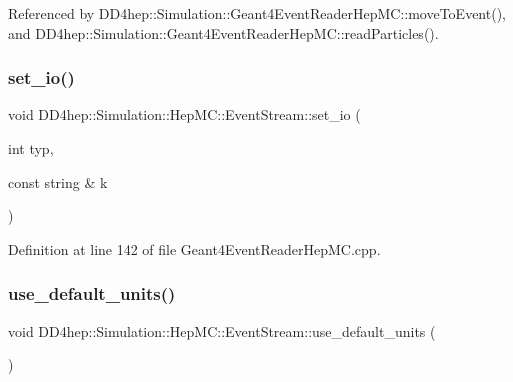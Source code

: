 Referenced by D\+D4hep\+::\+Simulation\+::\+Geant4\+Event\+Reader\+Hep\+M\+C\+::move\+To\+Event(), and D\+D4hep\+::\+Simulation\+::\+Geant4\+Event\+Reader\+Hep\+M\+C\+::read\+Particles().

\hypertarget{class_d_d4hep_1_1_simulation_1_1_hep_m_c_1_1_event_stream_a8c27011e1d7e6ae4b72e763d9253824d}{}\label{class_d_d4hep_1_1_simulation_1_1_hep_m_c_1_1_event_stream_a8c27011e1d7e6ae4b72e763d9253824d} 
\subsubsection{\texorpdfstring{set\+\_\+io()}{set\_io()}}
{\footnotesize\ttfamily void D\+D4hep\+::\+Simulation\+::\+Hep\+M\+C\+::\+Event\+Stream\+::set\+\_\+io (\begin{DoxyParamCaption}\item[{int}]{typ,  }\item[{const string \&}]{k }\end{DoxyParamCaption})\hspace{0.3cm}{\ttfamily [inline]}}



Definition at line 142 of file Geant4\+Event\+Reader\+Hep\+M\+C.\+cpp.

\hypertarget{class_d_d4hep_1_1_simulation_1_1_hep_m_c_1_1_event_stream_acd5b712fdee97581ee70ce3365b11270}{}\label{class_d_d4hep_1_1_simulation_1_1_hep_m_c_1_1_event_stream_acd5b712fdee97581ee70ce3365b11270} 
\subsubsection{\texorpdfstring{use\+\_\+default\+\_\+units()}{use\_default\_units()}}
{\footnotesize\ttfamily void D\+D4hep\+::\+Simulation\+::\+Hep\+M\+C\+::\+Event\+Stream\+::use\+\_\+default\+\_\+units (\begin{DoxyParamCaption}{ }\end{DoxyParamCaption})\hspace{0.3cm}{\ttfamily [inline]}}



